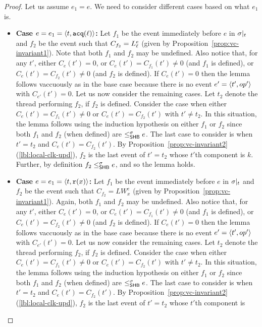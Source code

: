 \begin{proof}
Let us assume $e_1 = e$. We need to consider different cases based on
what $e_1$ is.
\begin{itemize}
\item {\bf Case $e = e_1 = \langle t,\mathtt{acq}(\ell)\rangle$:} Let $f_1$ be the event 
  immediately before $e$ in $\sigma|_{t}$ and $f_2$ be the event
  such that $C_{f_2} = L_\ell^e$ (given by
  Proposition~\ref{prop:vc-invariant1}). Note that both $f_1$ and
  $f_2$ may be undefined. Also notice that, for any $t'$, either
  $C_e(t') = 0$, or $C_e(t') = C_{f_1}(t') \neq 0$ (and $f_1$ is
  defined), or $C_e(t') = C_{f_2}(t') \neq 0$ (and $f_2$ is
  defined). If $C_e(t') = 0$ then the lemma follows vaccuously as in
  the base case because there is no event $e' = \langle t',op'\rangle$ with
  $C_{e'}(t') = 0$. Let us now consider the remaining cases. Let $t_2$
  denote the thread performing $f_2$, if $f_2$ is defined. Consider
  the case when either $C_e(t') = C_{f_1}(t') \neq 0$ or $C_e(t') =
  C_{f_2}(t')$ with $t' \neq t_2$. In this situation, the lemma
  follows using the induction hypothesis on either $f_1$ or $f_2$
  since both $f_1$ and $f_2$ (when defined) are $\leq^{\sigma}_{\mathsf{SHB}} e$. The
  last case to consider is when $t' = t_2$ and $C_e(t') =
  C_{f_2}(t')$. By
  Proposition~\ref{prop:vc-invariant2}(\ref{lbl:local-clk-upd}), $f_2$
  is the last event of $t' = t_2$ whose $t'$th component is
  $k$. Further, by definition $f_2 \leq^{\sigma}_{\mathsf{SHB}} e$, and so the lemma
  holds.
\item {\bf Case $e = e_1 = \langle t,\mathtt{r}(x)\rangle$:} Let $f_1$ be the event
  immediately before $e$ in $\sigma|_{t}$ and $f_2$ be the event
  such that $C_{f_2} = LW_x^e$ (given by
  Proposition~\ref{prop:vc-invariant1}). Again, both $f_1$ and $f_2$
  may be undefined. Also notice that, for any $t'$, either $C_e(t') =
  0$, or $C_e(t') = C_{f_1}(t') \neq 0$ (and $f_1$ is defined), or
  $C_e(t') = C_{f_2}(t') \neq 0$ (and $f_2$ is defined). If $C_e(t') =
  0$ then the lemma follows vaccuously as in the base case because
  there is no event $e' = \langle t',op'\rangle$ with $C_{e'}(t') = 0$. Let us
  now consider the remaining cases. Let $t_2$ denote the thread
  performing $f_2$, if $f_2$ is defined. Consider the case when either
  $C_e(t') = C_{f_1}(t') \neq 0$ or $C_e(t') = C_{f_2}(t')$ with
  $t' \neq t_2$. In this situation, the lemma follows using the
  induction hypothesis on either $f_1$ or $f_2$ since both $f_1$ and
  $f_2$ (when defined) are $\leq^{\sigma}_{\mathsf{SHB}} e$. The last case to consider is
  when $t' = t_2$ and $C_e(t') = C_{f_2}(t')$. By
  Proposition~\ref{prop:vc-invariant2}(\ref{lbl:local-clk-upd}), $f_2$
  is the last event of $t' = t_2$ whose $t'$th component is

\end{itemize}
\end{proof}
